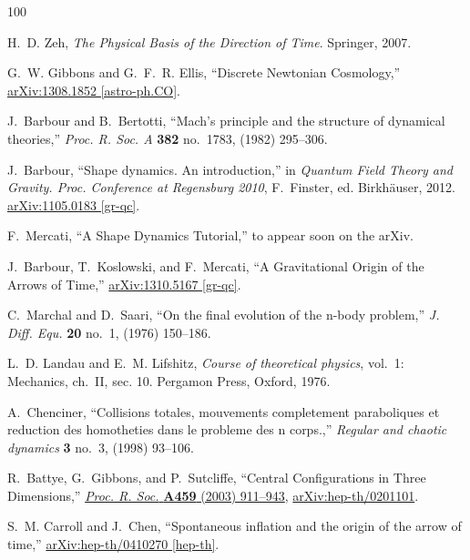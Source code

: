 \documentclass[prl,nofootinbib,twocolumn,superscriptaddress]{revtex4}
\begin{document}
\begin{thebibliography}{100}

H.~D. Zeh, {\em The Physical Basis of the Direction of Time}.
\newblock Springer, 2007.

G.~W. Gibbons and G.~F.~R. Ellis, ``Discrete Newtonian Cosmology,''
  \href{http://arxiv.org/abs/1308.1852}{{\ttfamily arXiv:1308.1852
  [astro-ph.CO]}}.

J.~Barbour and B.~Bertotti, ``{Mach's principle and the structure of dynamical
  theories},'' {\em Proc. R. Soc. A} {\bfseries 382} no.~1783, (1982) 295--306.

J.~Barbour, ``{Shape dynamics. An introduction},'' in {\em Quantum Field Theory
  and Gravity. Proc. Conference at Regensburg 2010}, F.~Finster, ed.
\newblock Birkh\"auser, 2012.
\newblock \href{http://arxiv.org/abs/1105.0183}{{\ttfamily arXiv:1105.0183
  [gr-qc]}}.

F.~Mercati, ``A Shape Dynamics Tutorial,'' to appear soon on the arXiv.

J.~Barbour, T.~Koslowski, and F.~Mercati, ``A Gravitational Origin of the
  Arrows of Time,'' \href{http://arxiv.org/abs/1310.5167}{{\ttfamily
  arXiv:1310.5167 [gr-qc]}}.

C.~Marchal and D.~Saari, ``On the final evolution of the n-body problem,'' {\em
  J. Diff. Equ.} {\bfseries 20} no.~1, (1976) 150--186.

L.~D. Landau and E.~M. Lifshitz, {\em Course of theoretical physics}, vol.~1:
  Mechanics, ch.~II, sec. 10.
\newblock Pergamon Press, Oxford, 1976.

A.~Chenciner, ``Collisions totales, mouvements completement paraboliques et
  reduction des homotheties dans le probleme des n corps.,'' {\em Regular and
  chaotic dynamics} {\bfseries 3} no.~3, (1998) 93--106.

R.~Battye, G.~Gibbons, and P.~Sutcliffe, ``Central Configurations in Three
  Dimensions,'' \href{http://dx.doi.org/10.1098/rspa.2002.1061}{{\em Proc. R.
  Soc.} {\bfseries A459} (2003) 911--943},
  \href{http://arxiv.org/abs/hep-th/0201101}{{\ttfamily arXiv:hep-th/0201101}}.



S.~M. Carroll and J.~Chen, ``Spontaneous inflation and the origin of the arrow
  of time,'' \href{http://arxiv.org/abs/hep-th/0410270}{{\ttfamily
  arXiv:hep-th/0410270 [hep-th]}}.



\end{thebibliography}
\end{document}
